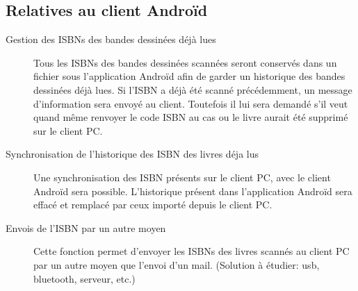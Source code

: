\subsection{Relatives au client Androïd}
\begin{description}

\item[Gestion des ISBNs des bandes dessinées déjà lues]
	Tous les ISBNs des bandes dessinées scannées seront conservés dans un fichier sous l'application Androïd afin de garder un historique des bandes dessinées déjà lues.
	Si l'ISBN a déjà été scanné précédemment, un message d'information sera envoyé au client. 
	Toutefois il lui sera demandé s'il veut quand même renvoyer le code ISBN au cas ou le livre aurait été supprimé sur le client PC. 

\item[Synchronisation de l'historique des ISBN des livres déja lus]
	Une synchronisation des ISBN présents sur le client PC, avec le client Androïd sera possible. 
	L'historique présent dans l'application Androïd sera effacé et remplacé par ceux importé depuis le client PC.

\item[Envois de l'ISBN par un autre moyen]
	Cette fonction permet d'envoyer les ISBNs des livres scannés au client PC par un autre moyen que l'envoi d'un mail. 
	(Solution à étudier: usb, bluetooth, serveur, etc.)

\end{description}
